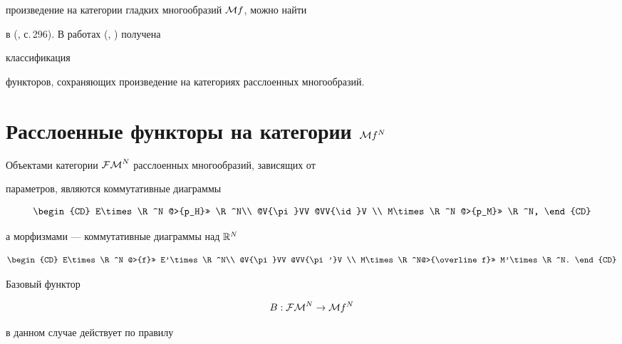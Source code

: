 произведение на категории гладких многообразий ${\cal M} f$, можно найти


в (\cite{KMS}, с.\,296). В работах (\cite{KM1}, \cite{Mik2}) получена


классификация


функторов, сохраняющих произведение на категориях расслоенных многообразий.











\section{Расслоенные функторы на категории ${\cal M} f^N$}





Объектами категории ${\cal{FM}}^N$ расслоенных многообразий, зависящих от


параметров, являются коммутативные диаграммы


$$


\begin{CD}


E\times\R^N @>{p_H}>> \R^N\\


@V{\pi}VV @VV{\id}V \\


M\times\R^N @>{p_M}>> \R^N,


\end{CD}


$$


а морфизмами --- коммутативные диаграммы над ${\Bbb R}^N$


$$


\begin{CD}


E\times\R^N @>{f}>> E'\times\R^N\\


@V{\pi}VV @VV{\pi'}V \\


M\times\R^N@>{\overline f}>> M'\times\R^N.


\end{CD}


$$


Базовый функтор


$$


B:\FM^N\to\M f^N


$$


в данном случае действует по правилу


